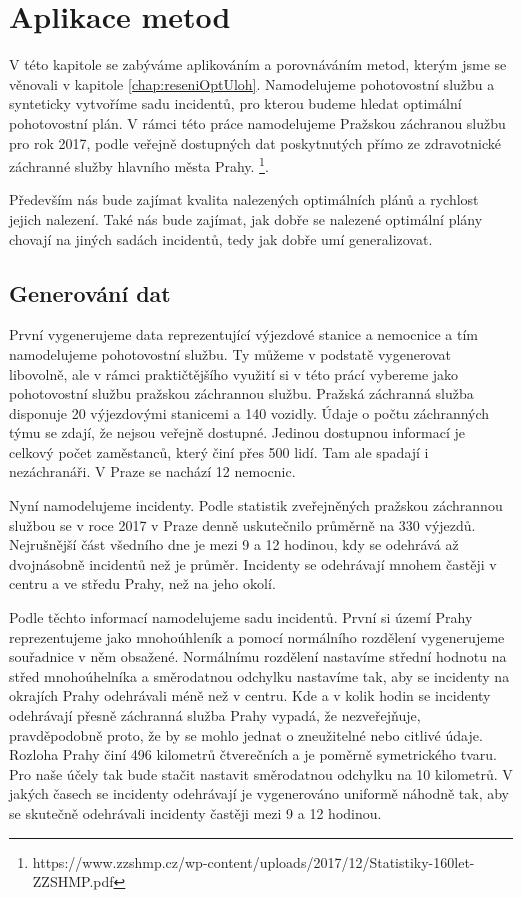 \chapter{Aplikace metod}

V této kapitole se zabýváme aplikováním a porovnáváním metod, kterým jsme se věnovali v kapitole \ref{chap:reseniOptUloh}.
Namodelujeme pohotovostní službu a synteticky vytvoříme sadu incidentů, pro kterou budeme hledat optimální pohotovostní plán.
V rámci této práce namodelujeme Pražskou záchranou službu pro rok 2017, podle veřejně dostupných dat
poskytnutých přímo ze zdravotnické záchranné služby hlavního města Prahy.
\footnote{https://www.zzshmp.cz/wp-content/uploads/2017/12/Statistiky-160let-ZZSHMP.pdf}.

Především nás bude zajímat kvalita nalezených optimálních plánů a rychlost jejich nalezení.
Také nás bude zajímat, jak dobře se nalezené optimální plány chovají na jiných sadách incidentů, tedy jak dobře umí generalizovat.

\section{Generování dat}

První vygenerujeme data reprezentující výjezdové stanice a nemocnice a tím namodelujeme pohotovostní službu.
Ty můžeme v podstatě vygenerovat libovolně, ale v rámci praktičtějšího využití
si v této prácí vybereme jako pohotovostní službu pražskou záchrannou službu.
Pražská záchranná služba disponuje 20 výjezdovými stanicemi a 140 vozidly.
Údaje o počtu záchranných týmu se zdají, že nejsou veřejně dostupné. Jedinou dostupnou informací je celkový počet zaměstanců, který činí přes 500 lidí.
Tam ale spadají i nezáchranáři.
V Praze se nachází 12 nemocnic.

Nyní namodelujeme incidenty. Podle statistik zveřejněných pražskou záchrannou službou se v roce 2017 v Praze denně uskutečnilo průměrně na 330 výjezdů.
Nejrušnější část všedního dne je mezi 9 a 12 hodinou, kdy se odehrává až dvojnásobně incidentů než je průměr.
Incidenty se odehrávají mnohem častěji v centru a ve středu Prahy, než na jeho okolí.

Podle těchto informací namodelujeme sadu incidentů.
První si území Prahy reprezentujeme jako mnohoúhleník a pomocí normálního rozdělení vygenerujeme souřadnice v něm obsažené.
Normálnímu rozdělení nastavíme střední hodnotu na střed mnohoúhelníka a směrodatnou odchylku nastavíme tak, aby se incidenty na okrajích Prahy odehrávali méně než v centru. 
Kde a v kolik hodin se incidenty odehrávají přesně záchranná služba Prahy vypadá, že nezveřejňuje, pravděpodobně proto, že by se mohlo jednat o zneužitelné nebo citlivé údaje.
Rozloha Prahy činí 496 kilometrů čtverečních a je poměrně symetrického tvaru. Pro naše účely tak bude stačit nastavit směrodatnou odchylku na 10 kilometrů.
V jakých časech se incidenty odehrávají je vygenerováno uniformě náhodně tak, aby se skutečně odehrávali incidenty častěji mezi 9 a 12 hodinou.

